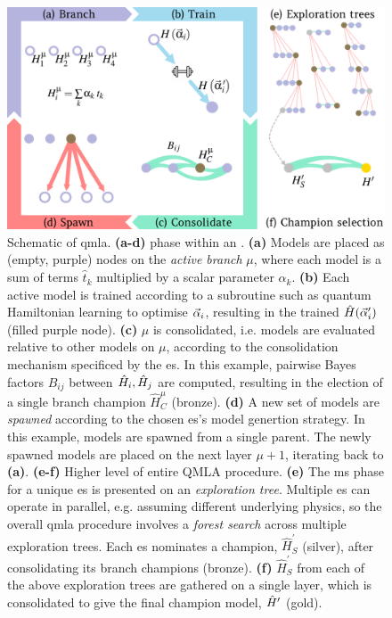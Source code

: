 \begin{figure}[t!]
    \begin{center}
        \includegraphics{algorithms/overview.jpg}
    \end{center}
    \caption[Quantum Model Learning Agent overview]{
        Schematic of \acrfull{qmla}. 
        \textbf{(a-d)}  phase within an .
        \textbf{(a)} Models are placed as (empty, purple) nodes on the \emph{active branch} $\mu$, 
            where each model is a sum of terms $\hat{t}_k$ multiplied by a scalar parameter $\alpha_k$. 
        \textbf{(b)} Each active model is trained according to a subroutine such as 
            quantum Hamiltonian learning to optimise $\vec{\alpha}_i$, 
            resulting in the trained $\hat{H}(\vec{\alpha}_i^{\prime})$ (filled purple node). 
        \textbf{(c)} $\mu$ is consolidated, i.e. models are evaluated relative to other
            models on $\mu$, according to the consolidation mechanism specificed by the \gls{es}.
            In this example, pairwise Bayes factors $B_{ij}$ between $\hat{H}_i, \hat{H}_j$ are computed, 
            resulting in the election of a single branch champion $\hat{H}_C^{\mu}$ (bronze). 
        \textbf{(d)} A new set of models are \emph{spawned} according to the chosen
            \gls{es}'s model genertion strategy.
            In this example, models are spawned from a single parent. 
            The newly spawned models are placed on the next layer $\mu+1$, 
            iterating back to \textbf{(a)}.
        \textbf{(e-f)} Higher level of entire QMLA procedure.
        \textbf{(e)} The \gls{ms} phase for a unique \gls{es} is presented on an \emph{exploration tree}. 
            Multiple \gls{es} can operate in parallel, e.g. assuming different underlying physics, 
            so the overall \gls{qmla} procedure involves a \emph{forest search} across multiple exploration trees.
            Each \gls{es} nominates a champion, $\hat{H}_{S}^{\prime}$ (silver), 
            after consolidating its branch champions (bronze). 
        \textbf{(f)} $\hat{H}_{S}^{\prime}$ from each of the above exploration trees are gathered on a single layer, 
            which is consolidated to give the final champion model, $\hat{H}^{\prime}$ (gold). 
    }
    \label{fig:qmla_overview}
\end{figure}

